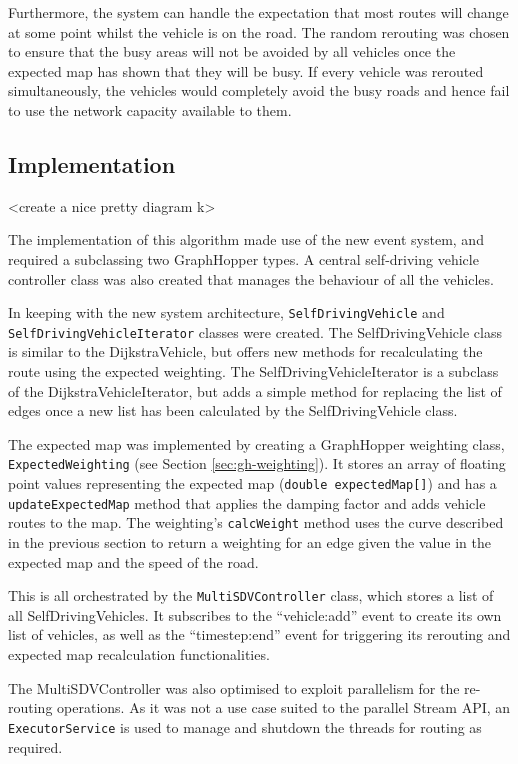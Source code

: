 \documentclass[ %
                    author={Alexander Hill},
                supervisor={Dr. Benjamin Sach},
                    degree={MEng},
                     title={MARMOSET},
                  subtitle={Multi-Agent Route Management using Online Simulation for Efficient Transportation},
                      type={research},
                      year={2016} ]{dissertation}
\begin{document}
Furthermore, the system can handle the expectation that most routes will
change at some point whilst the vehicle is on the road. The random rerouting was
chosen to ensure that the busy areas will not be avoided by all vehicles once the
expected map has shown that they will be busy. If every vehicle was rerouted
simultaneously, the vehicles would completely avoid the busy roads and hence
fail to use the network capacity available to them.

\subsection{Implementation}

<create a nice pretty diagram k>

The implementation of this algorithm made use of the new event system, and
required a subclassing two GraphHopper types. A central self-driving vehicle
controller class was also created that manages the behaviour of all the
vehicles.

In keeping with the new system architecture, \texttt{SelfDrivingVehicle} and
\texttt{SelfDrivingVehicleIterator} classes were created. The SelfDrivingVehicle
class is similar to the DijkstraVehicle, but offers new methods for
recalculating the route using the expected weighting. The
SelfDrivingVehicleIterator is a subclass of the DijkstraVehicleIterator, but
adds a simple method for replacing the list of edges once a new list has been
calculated by the SelfDrivingVehicle class.

The expected map was implemented by creating a GraphHopper weighting class,
\texttt{ExpectedWeighting} (see Section \ref{sec:gh-weighting}). It stores an
array of floating point values representing the expected map (\texttt{double
expectedMap[]}) and has a \texttt{updateExpectedMap} method that applies the
damping factor and adds vehicle routes to the map. The weighting's
\texttt{calcWeight} method uses the curve described in the previous section to
return a weighting for an edge given the value in the expected map and the speed
of the road.

This is all orchestrated by the \texttt{MultiSDVController} class, which stores
a list of all SelfDrivingVehicles. It subscribes to the ``vehicle:add'' event
to create its own list of vehicles, as well as the ``timestep:end'' event for
triggering its rerouting and expected map recalculation functionalities.

The MultiSDVController was also optimised to exploit parallelism for the
re-routing operations. As it was not a use case suited to the parallel Stream
API, an \texttt{ExecutorService} is used to manage and shutdown the threads for
routing as required.
\end{document}
